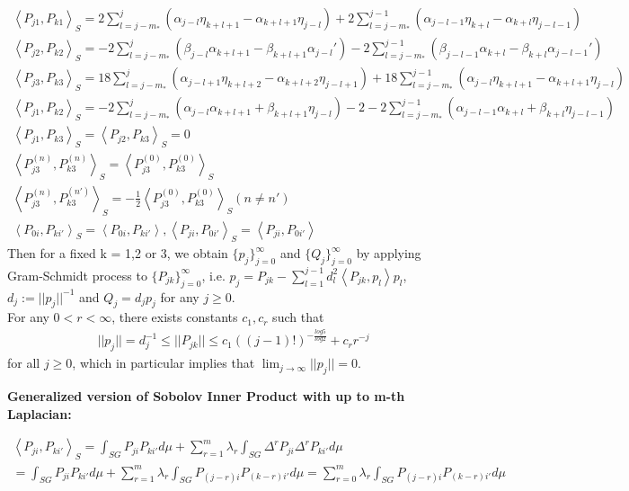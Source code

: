\documentclass[12pt]{article}
\theoremstyle{plain}
\theoremstyle{definition}
\theoremstyle{remark}
\newcommand{\inner}[2]{\left \langle #1, #2\right \rangle}
\newcommand{\lap}{\Delta}
\begin{document}
\begin{gather}
    \inner{P_{j1}}{P_{k1}}_S = 2\sum\limits_{l=j-m_{*}}^{j}\left(\alpha_{j-l}\eta_{k+l+1}-\alpha_{k+l+1}\eta_{j-l}\right) + 2\sum\limits_{l=j-m_{*}}^{j-1}\left(\alpha_{j-l-1}\eta_{k+l}-\alpha_{k+l}\eta_{j-l-1}\right) \\
    \inner{P_{j2}}{P_{k2}}_S = -2\sum\limits_{l=j-m_{*}}^{j}\left(\beta_{j-l}\alpha_{k+l+1}-\beta_{k+l+1}\alpha_{j-l}'\right) - 2\sum\limits_{l=j-m_{*}}^{j-1}\left(\beta_{j-l-1}\alpha_{k+l}-\beta_{k+l}\alpha_{j-l-1}'\right) \\
    \inner{P_{j3}}{P_{k3}}_S = 18\sum\limits_{l=j-m_{*}}^{j}\left(\alpha_{j-l+1}\eta_{k+l+2}-\alpha_{k+l+2}\eta_{j-l+1}\right)+18 \sum\limits_{l=j-m_{*}}^{j-1}\left(\alpha_{j-l}\eta_{k+l+1}-\alpha_{k+l+1}\eta_{j-l}\right) \\
    \inner{P_{j1}}{P_{k2}}_S = -2\sum\limits_{l=j-m_{*}}^{j}\left(\alpha_{j-l}\alpha_{k+l+1}+\beta_{k+l+1}\eta_{j-l}\right)-2
    -2\sum\limits_{l=j-m_{*}}^{j-1}\left(\alpha_{j-l-1}\alpha_{k+l}+\beta_{k+l}\eta_{j-l-1}\right)\\
    \inner{P_{j1}}{P_{k3}}_{S}=\inner{P_{j2}}{P_{k3}}_{S}=0\\
    \inner{P_{j3}^{(n)}}{P_{k3}^{(n)}}_{S}=\inner{P_{j3}^{(0)}}{P_{k3}^{(0)}}_{S}\\
    \inner{P_{j3}^{(n)}}{P_{k3}^{(n')}}_{S}=-\frac{1}{2}\inner{P_{j3}^{(0)}}{P_{k3}^{(0)}}_{S} (n\neq n') \\
    \inner{P_{0i}}{P_{ki'}}_{S}=\inner{P_{0i}}{P_{ki'}}, \inner{P_{ji}}{P_{0i'}}_{S}=\inner{P_{ji}}{P_{0i'}}
\end{gather}
Then for a fixed k = 1,2 or 3, we obtain $\{p_{j}\}_{j=0}^\infty$ and $\{Q_{j}\}_{j=0}^\infty$ by applying Gram-Schmidt process to $\{P_{jk}\}_{j=0}^\infty$, i.e. $p_j=P_{jk}-\sum\limits_{l=1}^{j-1}d_l^2\inner{P_{jk}}{p_l}p_l$, $d_j:=||p_j||^{-1}$ and $Q_j=d_jp_j$ for any $j \geq 0$. \\
For any $0 < r <\infty$, there exists constants $c_1, c_r$ such that 
\begin{gather}
   ||p_j||= d_j^{-1}\leq||P_{jk}||\le c_1((j-1)!)^{-\frac{log5}{log2}}+c_rr^{-j}
\end{gather}
for all $j \geq 0$, which in particular implies that $\lim_{j\to \infty}||p_j||=0$.
\newpage

\textbf{Generalized version of Sobolov Inner Product with up to m-th Laplacian:}

\begin{gather}
    \inner{P_{ji}}{P_{ki'}}_S = \int_{SG} P_{ji}P_{ki'} d \mu  + \sum\limits_{r=1}^{m}\lambda_{r}\int_{SG} \lap^{r} P_{ji}\lap^{r} P_{ki'} d \mu\\
    = \int_{SG} P_{ji}P_{ki'} d \mu  +\sum\limits_{r=1}^{m} \lambda_{r}\int_{SG} P_{(j-r)i} P_{(k-r)i'} d \mu 
    = \sum\limits_{r=0}^{m} \lambda_{r}\int_{SG} P_{(j-r)i} P_{(k-r)i'} d \mu
\end{gather}
\end{document}
